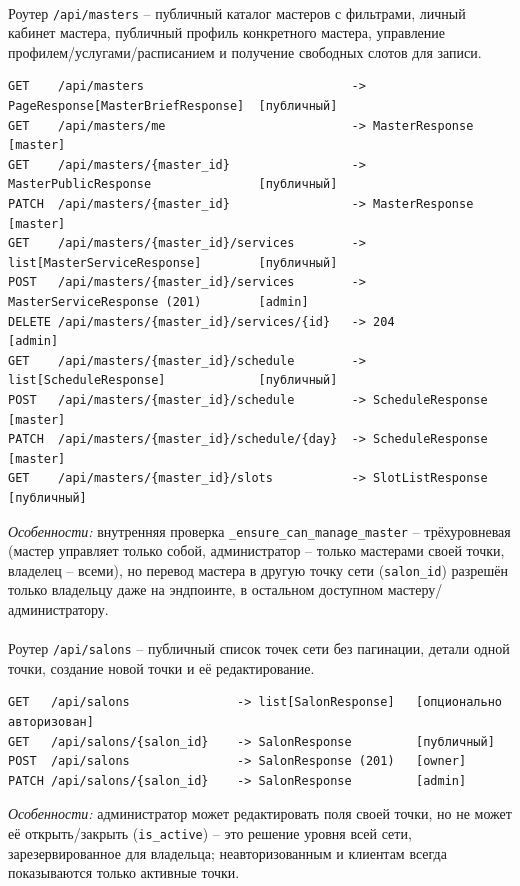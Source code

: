 \paragraph{}
Роутер \texttt{/api/masters} -- публичный каталог мастеров с фильтрами,
личный кабинет мастера, публичный профиль конкретного мастера, управление
профилем/услугами/расписанием и получение свободных слотов для записи.
\begin{verbatim}
GET    /api/masters                             -> PageResponse[MasterBriefResponse]  [публичный]
GET    /api/masters/me                          -> MasterResponse                     [master]
GET    /api/masters/{master_id}                 -> MasterPublicResponse               [публичный]
PATCH  /api/masters/{master_id}                 -> MasterResponse                     [master]
GET    /api/masters/{master_id}/services        -> list[MasterServiceResponse]        [публичный]
POST   /api/masters/{master_id}/services        -> MasterServiceResponse (201)        [admin]
DELETE /api/masters/{master_id}/services/{id}   -> 204                                [admin]
GET    /api/masters/{master_id}/schedule        -> list[ScheduleResponse]             [публичный]
POST   /api/masters/{master_id}/schedule        -> ScheduleResponse                   [master]
PATCH  /api/masters/{master_id}/schedule/{day}  -> ScheduleResponse                   [master]
GET    /api/masters/{master_id}/slots           -> SlotListResponse                   [публичный]
\end{verbatim}
\textit{Особенности:} внутренняя проверка
\texttt{_ensure_can_manage_master} -- трёхуровневая (мастер управляет
только собой, администратор -- только мастерами своей точки, владелец --
всеми), но перевод мастера в другую точку сети (\texttt{salon_id})
разрешён только владельцу даже на эндпоинте, в остальном доступном
мастеру/администратору.

\paragraph{}
Роутер \texttt{/api/salons} -- публичный список точек сети без
пагинации, детали одной точки, создание новой точки и её редактирование.
\begin{verbatim}
GET   /api/salons               -> list[SalonResponse]   [опционально авторизован]
GET   /api/salons/{salon_id}    -> SalonResponse         [публичный]
POST  /api/salons               -> SalonResponse (201)   [owner]
PATCH /api/salons/{salon_id}    -> SalonResponse         [admin]
\end{verbatim}
\textit{Особенности:} администратор может редактировать поля своей
точки, но не может её открыть/закрыть (\texttt{is_active}) -- это
решение уровня всей сети, зарезервированное для владельца; неавторизованным
и клиентам всегда показываются только активные точки.

